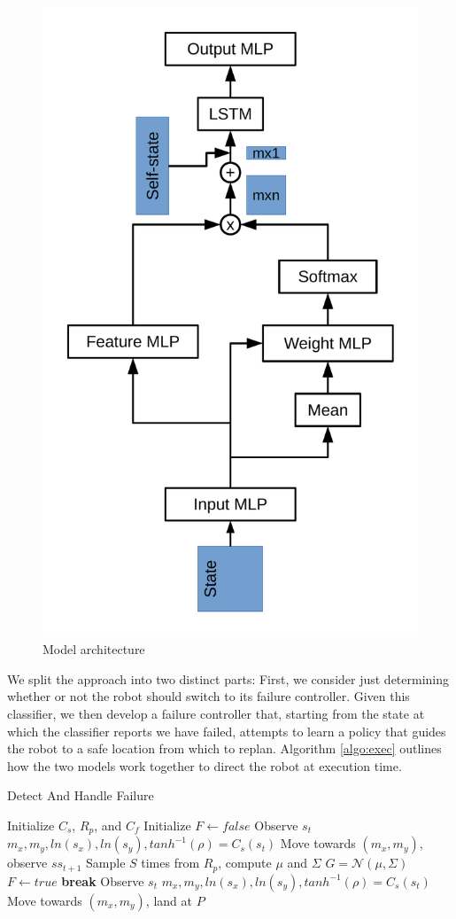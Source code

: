 \documentclass[letterpaper, 10 pt, conference]{ieeeconf}  %
\begin{document}
	\begin{figure}
		\centering
		\includegraphics[height=\linewidth, angle=270]{model_arch.pdf}
		\caption{Model architecture}
		\label{fig:model_arch}
	\end{figure}
	
	We split the approach into two distinct parts: First, we consider just determining whether or not the robot should switch to its failure controller. Given this classifier, we then develop a failure controller that, starting from the state at which the classifier reports we have failed, attempts to learn a policy that guides the robot to a safe location from which to replan. Algorithm \ref{algo:exec} outlines how the two models work together to direct the robot at execution time.
	
	\begin{algorithm}[H]
		\caption{Detect And Handle Failure}
		\label{algo:exec}
		\begin{algorithmic}
				\State Initialize $C_s$, $R_p$, and $C_f$
				\State Initialize $F\leftarrow false$
					\State Observe $s_t$
					\State $m_x,m_y,ln(s_x),ln(s_y),tanh^{-1}(\rho)=C_s(s_t)$
					\State Move towards $(m_x,m_y)$, observe $ss_{t+1}$
					\State Sample $S$ times from $R_p$, compute $\mu$ and $\Sigma$
					\State $G = \mathcal{N}(\mu, \Sigma)$
						\State $F\leftarrow true$
						\State \textbf{break}
					\EndIf
				\EndFor
				\If{$F$}
					\For{$t=1..t_m$}
						\State Observe $s_t$
						\State $m_x,m_y,ln(s_x),ln(s_y),tanh^{-1}(\rho)=C_s(s_t)$
						\State Move towards $(m_x,m_y)$, land at $P$
					\EndFor
				\EndIf
			\EndFunction
		\end{algorithmic}
	\end{algorithm}
	
\end{document}
